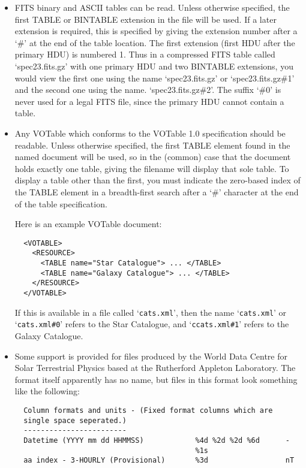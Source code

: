 \documentclass[twoside,11pt]{article}
\renewcommand{\_}{\texttt{\symbol{95}}}
\begin{document}
\begin{itemize}

\item FITS binary and ASCII tables can be read.  Unless otherwise specified,
the first TABLE or BINTABLE extension in the file will be used.
If a later extension is required, this is specified by giving the
extension number after a `\#' at the end of the table location.
The first extension (first HDU after the primary HDU) is numbered 1.
Thus in a compressed FITS table called `spec23.fits.gz'
with one primary HDU and two BINTABLE extensions,
you would view the first one using the name `spec23.fits.gz'
or `spec23.fits.gz\#1' and the second one using the name.
`spec23.fits.gz\#2'.  The suffix `\#0' is never used for a legal
FITS file, since the primary HDU cannot contain a table.

\item Any VOTable which conforms to the VOTable 1.0 specification should be
readable.
Unless otherwise specified, the first TABLE element found in the 
named document will be used, so in the (common) case that
the document holds exactly one table, giving the filename will
display that sole table.
To display a table other than the first, you must indicate the
zero-based index of the TABLE element in a breadth-first search
after a `\#' character at the end of the table specification.

Here is an example VOTable document:
\begin{verbatim}
  <VOTABLE>
    <RESOURCE>
      <TABLE name="Star Catalogue"> ... </TABLE>
      <TABLE name="Galaxy Catalogue"> ... </TABLE>
    </RESOURCE>
  </VOTABLE>
\end{verbatim}
If this is available in a file called `\texttt{cats.xml}', then the name
`\texttt{cats.xml}' or `\texttt{cats.xml\#0}' refers to the Star Catalogue, and
`\texttt{ccats.xml\#1}' refers to the Galaxy Catalogue.


\item Some support is provided for files produced by the World Data Centre
for Solar Terrestrial Physics based at the Rutherford Appleton Laboratory.
The format itself apparently has no name, but files in this format
look something like the following:
\begin{verbatim}
  Column formats and units - (Fixed format columns which are 
  single space seperated.)
  ------------------------
  Datetime (YYYY mm dd HHMMSS)            %4d %2d %2d %6d      -
                                          %1s
  aa index - 3-HOURLY (Provisional)       %3d                  nT


\end{verbatim}
\end{itemize}
\end{document}
